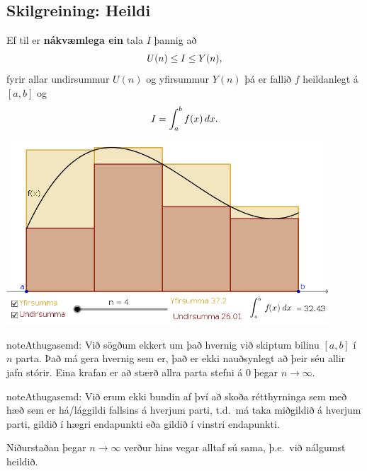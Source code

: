 \documentclass[b5paper,10pt,icelandic]{sphinxmanual}
\begin{document}
\subsection{Skilgreining: Heildi}
\label{kafli06:skilgreining-heildi}
Ef til er \textbf{nákvæmlega ein} tala \(I\) þannig að
\begin{gather}
\begin{split}U(n) \leq I \leq Y(n),\end{split}\notag
\end{gather}
fyrir allar undirsummur \(U(n)\) og yfirsummur \(Y(n)\) þá er
fallið \(f\) heildanlegt á \([a,b]\) og
\begin{gather}
\begin{split}I = \int_a^b f(x)\, dx.\end{split}\notag
\end{gather}

\begin{center}
\includegraphics[width=12cm,keepaspectratio=true]{./03_undirogyfirsumma.png}
\end{center}


\begin{notice}{note}{Athugasemd:}
Við sögðum ekkert um það hvernig við skiptum bilinu \([a,b]\) í
\(n\) parta. Það má gera hvernig sem er, það er ekki nauðsynlegt að
þeir séu allir jafn stórir. Eina krafan er að stærð allra parta stefni á
0 þegar \(n\to \infty\).
\end{notice}

\begin{notice}{note}{Athugasemd:}
Við erum ekki bundin af því að skoða rétthyrninga sem með hæð sem er
há/lággildi fallsins á hverjum parti, t.d. má taka miðgildið á hverjum
parti, gildið í hægri endapunkti eða gildið í vinstri endapunkti.

Niðurstaðan þegar \(n\to \infty\) verður hins vegar alltaf sú sama,
þ.e. við nálgumst heildið.
\end{notice}
\end{document}
